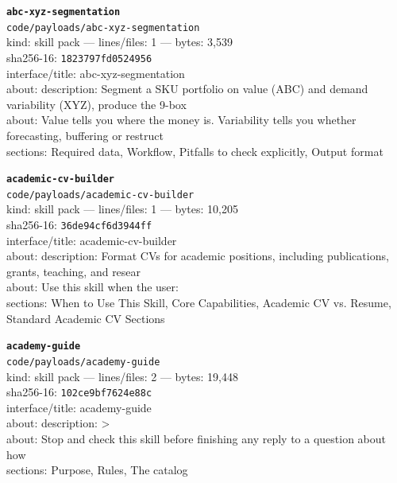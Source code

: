 \noindent\textbf{\texttt{abc-xyz-segmentation}}\\
\texttt{code/payloads/abc-xyz-segmentation}\\
kind: skill pack --- lines/files: 1 --- bytes: 3,539\\
sha256-16: \texttt{1823797fd0524956}\\
interface/title: abc-xyz-segmentation\\
about: description: Segment a SKU portfolio on value (ABC) and demand variability (XYZ), produce the 9-box \\
about: Value tells you where the money is. Variability tells you whether forecasting, buffering or restruct\\
sections: Required data, Workflow, Pitfalls to check explicitly, Output format\\
\vspace*{6.0pt}

\noindent\textbf{\texttt{academic-cv-builder}}\\
\texttt{code/payloads/academic-cv-builder}\\
kind: skill pack --- lines/files: 1 --- bytes: 10,205\\
sha256-16: \texttt{36de94cf6d3944ff}\\
interface/title: academic-cv-builder\\
about: description: Format CVs for academic positions, including publications, grants, teaching, and resear\\
about: Use this skill when the user:\\
sections: When to Use This Skill, Core Capabilities, Academic CV vs. Resume, Standard Academic CV Sections\\
\vspace*{6.0pt}
\newpage

\noindent\textbf{\texttt{academy-guide}}\\
\texttt{code/payloads/academy-guide}\\
kind: skill pack --- lines/files: 2 --- bytes: 19,448\\
sha256-16: \texttt{102ce9bf7624e88c}\\
interface/title: academy-guide\\
about: description: >\\
about: Stop and check this skill before finishing any reply to a question about how\\
sections: Purpose, Rules, The catalog\\
\vspace*{6.0pt}

